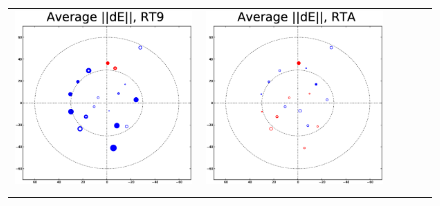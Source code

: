 \documentclass[]{article}
\begin{document}
\begin{figure}
\begin{tabular}{@{}c@{}c@{}c@{}c@{}c@{}}
\includegraphics[width=\roguewidth]{qmc2b_dE_ant9} &
\includegraphics[width=\roguewidth]{qmc2b_dE_antA} \\
&

\end{tabular}
\end{figure}
\end{document}
